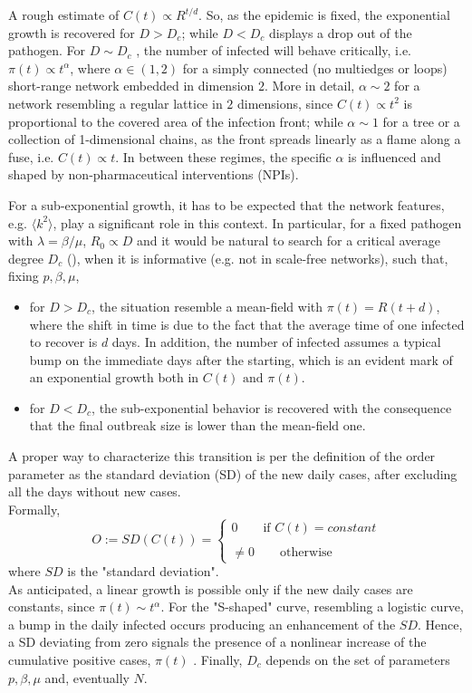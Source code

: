 \documentclass[a4paper,10pt,twoside]{book} %
\theoremstyle{definition}
\begin{document}
A rough estimate of $C(t) \propto R^{t/d}$. So, as the epidemic is fixed, the exponential growth is recovered for $D > D_c$; while $D < D_c$ displays a drop out of the pathogen. For $D \sim D_c$ \cite{Thurner::NetBasedExpl}, the number of infected will behave critically, i.e. $\pi(t) \propto t^{\alpha}$, where $\alpha \in (1,2)$ for a simply connected (no multiedges or loops) short-range network embedded in dimension $2$. More in detail, $\alpha \sim 2$ for a network resembling a regular lattice in $2$ dimensions, since $C(t) \propto t^2$ is proportional to the covered area of the infection front; while $\alpha \sim 1$ for a tree or a collection of 1-dimensional chains, as the front spreads linearly as a flame along a fuse, i.e. $C(t) \propto t$. In between these regimes, the specific $\alpha$ is influenced and shaped by non-pharmaceutical interventions (NPIs).

For a sub-exponential growth, it has to be expected that the network features, e.g. $\langle k^2 \rangle$, play a significant role in this context. In particular, for a fixed pathogen with $\lambda = \beta/ \mu$, $R_0 \propto D$ and it would be natural to search for a critical average degree $D_c$ (\cite{Thurner::NetBasedExpl}), when it is informative (e.g. not in scale-free networks), such that, fixing $p, \beta, \mu$, 
\begin{itemize}
	\item for $D>D_c$, the situation resemble a mean-field with $\pi(t) = R(t+d)$, where the shift in time is due to the fact that the average time of one infected to recover is $d$ days. In addition, the number of infected assumes a typical bump on the immediate days after the starting, which is an evident mark of an exponential growth both in $C(t) \text{ and } \pi(t)$.
	\item for $D<D_c$, the sub-exponential behavior is recovered with the consequence that the final outbreak size is lower than the mean-field one.
\end{itemize}
A proper way to characterize this transition is per the definition of the order parameter \cite{Thurner::NetBasedExpl} as the standard deviation (SD) of the new daily cases, after excluding all the days without new cases.
\\Formally,
\begin{equation}
	O := SD(C(t)) = 
	\begin{cases}
		0 \qquad \text{if $C(t) = constant$}\\\\
		\neq 0 \qquad \text{otherwise} 
	\end{cases}
\end{equation}
where $SD$ is the "standard deviation".
\\As anticipated, a linear growth is possible only if the new daily cases are constants, since $\pi(t) \sim t^{\alpha}$. For the "S-shaped" curve, resembling a logistic curve, a bump in the daily infected occurs producing an enhancement of the $SD$. Hence, a SD deviating from zero signals the presence of a nonlinear increase of the cumulative positive cases, $\pi(t)$ \cite{Thurner::NetBasedExpl}. Finally, $D_c$ depends on the set of parameters $p, \beta, \mu$ \cite{Thurner::NetBasedExpl} and, eventually $N$.
\end{document}
